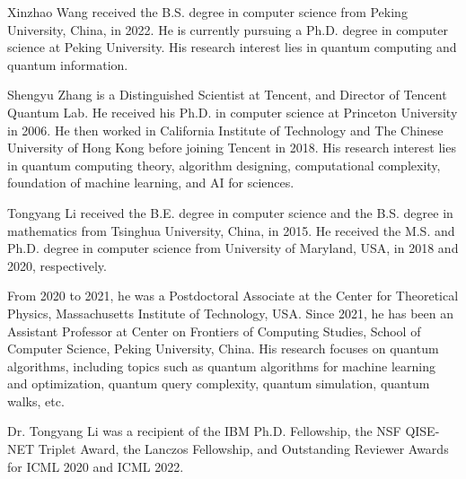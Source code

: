 \documentclass[journal]{IEEEtran}
\begin{document}
\appendix





\vspace{11pt}

\begin{IEEEbiographynophoto}{Xinzhao Wang} received the B.S. degree in computer science from Peking University, China, in 2022. He is currently pursuing a Ph.D. degree in computer science at Peking University. His research interest lies in quantum computing and quantum information.
\end{IEEEbiographynophoto}

\begin{IEEEbiographynophoto}{Shengyu Zhang} is a Distinguished Scientist at Tencent, and Director of Tencent Quantum Lab. He received his Ph.D. in computer science at Princeton University in 2006. He then worked in California Institute of Technology and The Chinese University of Hong Kong before joining Tencent in 2018. His research interest lies in quantum computing theory, algorithm designing, computational complexity, foundation of machine learning, and AI for sciences. 
\end{IEEEbiographynophoto}

\begin{IEEEbiographynophoto}{Tongyang Li} received the B.E. degree in computer science and the B.S. degree in mathematics from Tsinghua University, China, in 2015. He received the M.S. and Ph.D. degree in computer science from University of Maryland, USA, in 2018 and 2020, respectively. 

From 2020 to 2021, he was a Postdoctoral Associate at the Center for Theoretical Physics, Massachusetts Institute of Technology, USA. Since 2021, he has been an Assistant Professor at Center on Frontiers of Computing Studies, School of Computer Science, Peking University, China. His research focuses on quantum algorithms, including topics such as quantum algorithms for machine learning and optimization, quantum query complexity, quantum simulation, quantum walks, etc. 

Dr. Tongyang Li was a recipient of the IBM Ph.D. Fellowship, the NSF QISE-NET Triplet Award, the Lanczos Fellowship, and Outstanding Reviewer Awards for ICML 2020 and ICML 2022.
\end{IEEEbiographynophoto}


\vfill
\end{document}
